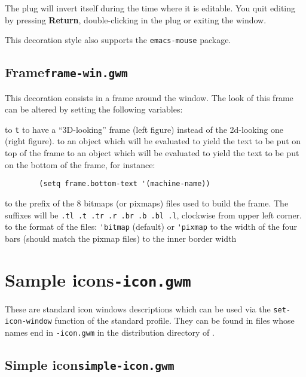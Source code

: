 The plug will invert itself during the time where it is editable. You quit
editing by pressing {\bf Return}, double-clicking in the plug or exiting the
window.

This decoration style also supports the \verb"emacs-mouse" package.

\subsection{Frame\hfill{\tt frame-win.gwm}}
\label{frame-win}

\centerline{\hfil
{}\hfil
{}\hfil}

This decoration consists in a frame around the window. The look of this
frame can be altered by setting the following variables:

\begin{description}
 to {\tt t} to have a ``3D-looking'' frame (left figure) 
instead of the 2d-looking one (right figure).
 to an object which will be evaluated to yield the
text to be put on top of the frame
 to an object which will be evaluated to yield the
text to be put on the bottom of the frame, for instance:
{\exemplefont\begin{verbatim}
        (setq frame.bottom-text '(machine-name))
\end{verbatim}}
 to the prefix of the 8 bitmaps (or pixmaps) files
used to build the frame. The suffixes will be {\tt .tl .t .tr .r .br .b .bl
.l}, clockwise from upper left corner.
 to the format of the files: \verb"'bitmap"
(default) or \verb"'pixmap"
 to the width of the four bars (should match the
pixmap files)
 to the inner border width
\end{description}

\section{Sample icons\hfill{\tt *-icon.gwm}}
\label{standard-icons}

These are standard icon windows descriptions which can be used via the
\verb"set-icon-window" function of the standard profile. They can be found in
files whose names end in {\tt -icon.gwm} in the distribution directory of
{\GWM}.

\subsection{Simple icon\hfill{\tt simple-icon.gwm}}
\label{simple-icon}

